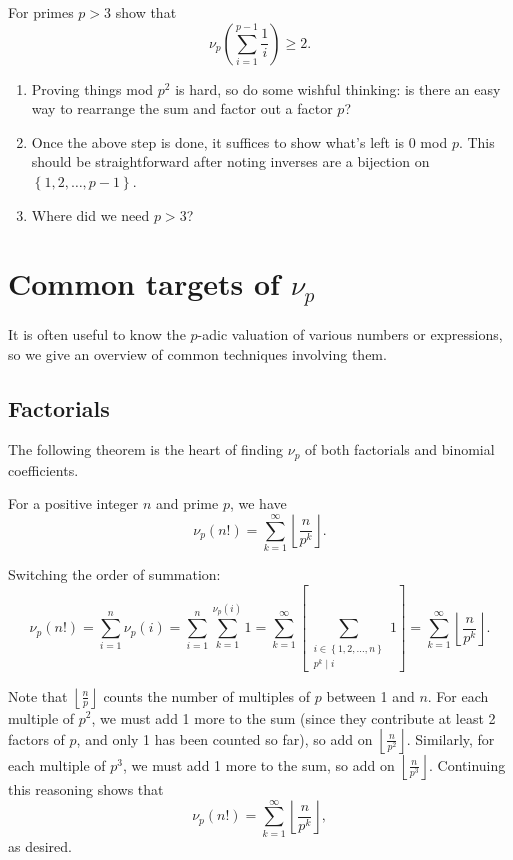 \documentclass{article}
\begin{document}
\begin{exam}
    For primes $p>3$ show that \[\nu_p\left( \sum_{i=1}^{p-1}\frac1i \right)\geq 2.\]
\end{exam}

\begin{walk}
    \begin{enumerate}
        \item Proving things mod $p^2$ is hard, so do some wishful thinking: is there an easy way to rearrange the sum and factor out a factor $p$?
        \item Once the above step is done, it suffices to show what's left is 0 mod $p$. This should be straightforward after noting inverses are a bijection on $\left\{ 1,2,\dots,p-1 \right\}$.
        \item Where did we need $p>3$?
    \end{enumerate}
\end{walk}

\section{Common targets of $\nu_p$}
It is often useful to know the $p$-adic valuation of various numbers or expressions, so we give an overview of common techniques involving them.
\subsection{Factorials}
The following theorem is the heart of finding $\nu_p$ of both factorials and binomial coefficients.
\begin{theo}[Legendre]
    For a positive integer $n$ and prime $p$, we have \[\nu_p(n!)=\sum_{k=1}^{\infty}\left\lfloor \frac n{p^k} \right\rfloor.\]
\end{theo}

\begin{pro}[1]
    Switching the order of summation: \[\nu_p(n!)=\sum_{i=1}^n \nu_p(i)=\sum_{i=1}^n\sum_{k=1}^{\nu_p(i)}1=\sum_{k=1}^{\infty}\left[\sum_{\substack{i\in\left\{ 1,2,\dots,n \right\}\\ p^k\mid i}}1\right]=\sum_{k=1}^\infty\left\lfloor \frac n{p^k} \right\rfloor.\]
\end{pro}

\begin{pro}[2]
    Note that $\left\lfloor \frac np \right\rfloor$ counts the number of multiples of $p$ between 1 and $n$. For each multiple of $p^2$, we must add 1 more to the sum (since they contribute at least 2 factors of $p$, and only 1 has been counted so far), so add on $\left\lfloor \frac n{p^2} \right\rfloor$. Similarly, for each multiple of $p^3$, we must add 1 more to the sum, so add on $\left\lfloor \frac n{p^3} \right\rfloor$. Continuing this reasoning shows that \[\nu_p(n!)=\sum_{k=1}^{\infty}\left\lfloor \frac n{p^k} \right\rfloor,\] as desired.
\end{pro}
\end{document}
